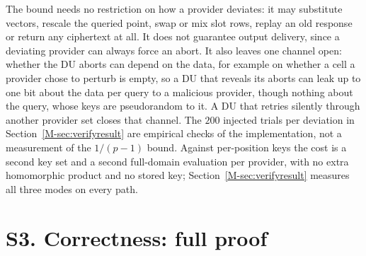 \documentclass[11pt,a4paper]{article}
\newcommand{\mref}[1]{\ref{M-#1}}
\newcommand{\authorcheck}[1]{}
\begin{document}
The bound needs no restriction on how a provider deviates: it may substitute
vectors, rescale the queried point, swap or mix slot rows, replay an old
response or return any ciphertext at all. It does not guarantee output
delivery, since a deviating provider can always force an abort. It also leaves
one channel open: whether the DU aborts can depend on the data, for example on
whether a cell a provider chose to perturb is empty, so a DU that reveals its
aborts can leak up to one bit about the data per query to a malicious
provider, though nothing about the query, whose keys are pseudorandom to it. A
DU that retries silently through another provider set closes that channel.
The $200$ injected trials per deviation in Section~\mref{sec:verifyresult} are
empirical checks of the implementation, not a measurement of the $1/(p-1)$
bound.\authorcheck{Have the session-check reduction, including the
computational DPF hybrid and adaptive abort leakage, checked by a reader outside
the project.}
Against per-position keys the cost is a second key set and a second full-domain
evaluation per provider, with no extra homomorphic product and no stored key;
Section~\mref{sec:verifyresult} measures all three modes on every path.


\section*{S3. Correctness: full proof}
\end{document}
